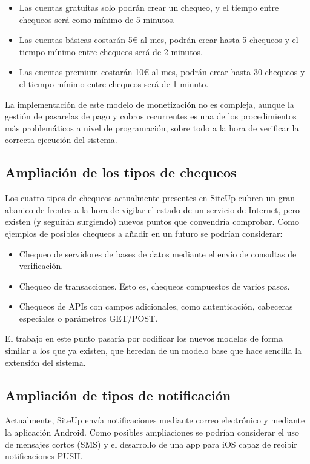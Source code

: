 \begin{itemize}
\item Las cuentas gratuitas solo podrán crear un chequeo, y el tiempo entre
  chequeos será como mínimo de 5 minutos.
\item Las cuentas básicas costarán 5€ al mes, podrán crear hasta 5 chequeos y el
  tiempo mínimo entre chequeos será de 2 minutos.
\item Las cuentas premium costarán 10€ al mes, podrán crear hasta 30 chequeos y
  el tiempo mínimo entre chequeos será de 1 minuto.
\end{itemize}

La implementación de este modelo de monetización no es compleja, aunque la
gestión de pasarelas de pago y cobros recurrentes es una de los procedimientos
más problemáticos a nivel de programación, sobre todo a la hora de verificar la
correcta ejecución del sistema. 

\subsection{Ampliación de los tipos de chequeos}

Los cuatro tipos de chequeos actualmente presentes en SiteUp cubren un gran
abanico de frentes a la hora de vigilar el estado de un servicio de Internet,
pero existen (y seguirán surgiendo) nuevos puntos que convendría comprobar. Como
ejemplos de posibles chequeos a añadir en un futuro se podrían considerar:

\begin{itemize}
\item Chequeo de servidores de bases de datos mediante el envío de consultas de
  verificación.
\item Chequeo de transacciones. Esto es, chequeos compuestos de varios pasos.
\item Chequeos de APIs con campos adicionales, como autenticación, cabeceras
  especiales o parámetros GET/POST.
\end{itemize}

El trabajo en este punto pasaría por codificar los nuevos modelos de forma
similar a los que ya existen, que heredan de un modelo base que hace sencilla la
extensión del sistema.

\subsection{Ampliación de tipos de notificación}

Actualmente, SiteUp envía notificaciones mediante correo electrónico y mediante
la aplicación Android. Como posibles ampliaciones se podrían considerar el uso
de mensajes cortos (SMS) y el desarrollo de una app para iOS capaz de recibir
notificaciones PUSH.

